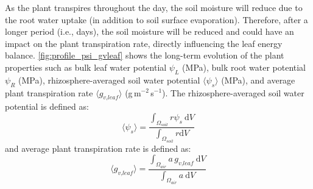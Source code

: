 As the plant transpires throughout the day, the soil moisture will reduce due to the root water uptake (in addition to soil surface evaporation). Therefore, after a longer period (i.e., days), the soil moisture will be reduced and could have an impact on the plant transpiration rate, directly influencing the leaf energy balance. \cref{fig:profile_psi_gvleaf} shows the long-term evolution of the plant properties such as bulk leaf water potential $\psi_L$ (MPa), bulk root water potential $\psi_R$ (MPa), rhizosphere-averaged soil water potential $\langle \psi_s \rangle$ (MPa), and average plant transpiration rate $\langle g_{\textit{v,leaf}} \rangle$ (g\,m$^{-2}$\,s$^{-1}$). The rhizosphere-averaged soil water potential is defined as:
\begin{equation}
\langle \psi_s \rangle = \frac{\int_{\Omega_{\textit{soil}}} r \psi_s~\mathrm{d}V}{\int_{\Omega_{\textit{soil}}} r \mathrm{d}V }
\end{equation}
and average plant transpiration rate is defined as:
\begin{equation}
\langle g_{\textit{v,leaf}} \rangle= \frac{\int_{\Omega_{\textit{air}}} a\, g_{\textit{v,leaf}}~\mathrm{d}V}{\int_{\Omega_{\textit{air}}} a~\mathrm{d}V }
\end{equation}

